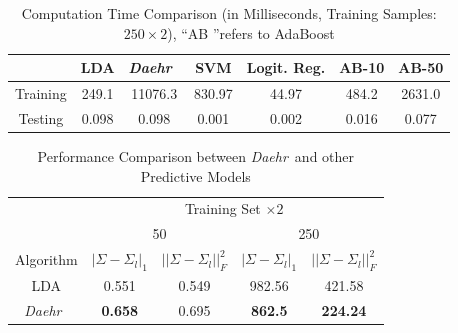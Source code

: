 \documentclass[journal,compsoc]{IEEEtran}
\newcommand{\TheName}{\mbox{\emph{Daehr}}}
\begin{document}
\begin{table}
\centering
\caption{Computation Time Comparison (in Milliseconds, Training Samples: $250\times 2$), ``AB ''refers to AdaBoost}
\footnotesize
\begin{tabular}{|c|c|c|c|c|c|c|}\hline
&LDA&\TheName\ &SVM&Logit. Reg. & AB-10 & AB-50\\\hline

Training  &	249.1	&  11076.3  &  830.97  &  44.97  &  484.2 & 2631.0  \\\hline

Testing   &	0.098	&  0.098   &  0.001    &  0.002  &  0.016 & 0.077  \\\hline

\end{tabular}
\label{tab:time-consuming}
\end{table}


\begin{table}
\footnotesize{
\begin{center}
\caption{Performance Comparison between \TheName\ and other Predictive Models}
		\label{tab:matrix-error}
\begin{tabular}{*{5}{c}}
\toprule
    &  \multicolumn{4}{c}{Training Set $ \times 2$}\\
    \cmidrule(lr){2-5}
    &  
    \multicolumn{2}{c}{50} &
    \multicolumn{2}{c}{250} \\
\cmidrule(lr){2-3}
\cmidrule(lr){4-5}
Algorithm & $|\Sigma-\Sigma_{l}|_1$ & $||\Sigma-\Sigma_{l}||_F^2$ & $|\Sigma-\Sigma_{l}|_1$ & $||\Sigma-\Sigma_{l}||_F^2$  \\
 \cmidrule(lr){1-1}                        
 \cmidrule(lr){2-3}
\cmidrule(lr){4-5}
    LDA &   0.551 & 0.549  &     982.56 & 421.58  \\

     \cmidrule(lr){1-1}                        
 \cmidrule(lr){2-3}
\cmidrule(lr){4-5}

     \TheName\ &  \textbf{0.658} & 0.695  &     \textbf{862.5} & \textbf{224.24}      \\

     \bottomrule

\end{tabular}

\end{center}
}
\end{table}
\end{document}
